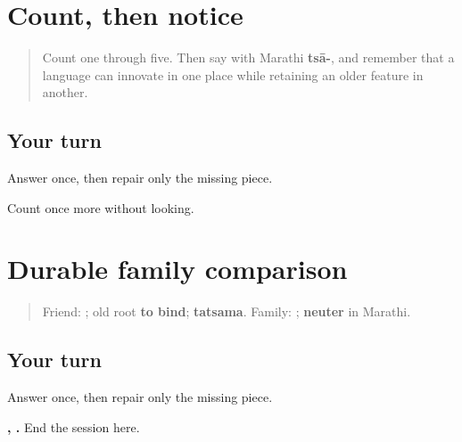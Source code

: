 \section[\texorpdfstring{\mr{एक} \mr{ते} \mr{पाच} (ek te paach)}{एक ते पाच (ek te paach)}]{Count, then notice}

\label{lesson:MR-R14-numbers}



\begin{quote}
Count one through five. Then say \textbf{} with Marathi \textbf{tsā-}, and remember that a language can innovate in one place while retaining an older feature in another.
\end{quote}

\subsection*{Your turn}
Answer once, then repair only the missing piece.

\begin{tcolorbox}[breakable,colback=teal!4,colframe=teal!35!black,title={Before you move on}]
Count once more without looking.
\end{tcolorbox}
\section[\texorpdfstring{\mr{मित्र} / \mr{कुटुंब} (mitra / kutumb)}{मित्र / कुटुंब (mitra / kutumb)}]{Durable family comparison}

\label{lesson:MR-R14-kutumb-r3}



\begin{quote}
Friend: \textbf{}; old root \textbf{to bind}; \textbf{tatsama}. Family: \textbf{}; \textbf{neuter} in Marathi.
\end{quote}

\subsection*{Your turn}
Answer once, then repair only the missing piece.

\begin{tcolorbox}[breakable,colback=teal!4,colframe=teal!35!black,title={Before you move on}]
\textbf{, .} End the session here.
\end{tcolorbox}

